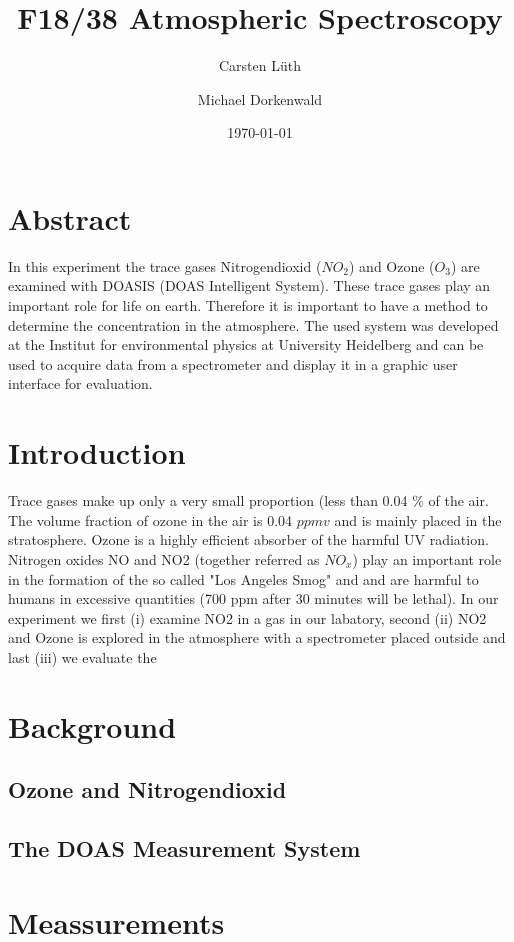 \documentclass[12pt, english]{scrartcl} %
\title{F18/38 Atmospheric Spectroscopy}
\author{Carsten L{\"u}th \and Michael Dorkenwald}
\date{\today}
\begin{document}
\maketitle

\begin{multicols}{2}


\section{Abstract}
In this experiment the trace gases Nitrogendioxid ($NO_2$) and Ozone ($O_3$) are examined with DOASIS (DOAS Intelligent System). These trace gases play an important role for life on earth. Therefore it is important to have a method to determine the concentration in the atmosphere. The used system was developed at the Institut for environmental physics at University Heidelberg and can be used to acquire data from a spectrometer and display it in a graphic user interface for evaluation.
\section{Introduction}
Trace gases make up only a very small proportion (less than 0.04 $\%$ of the air. The volume fraction of ozone in the air is 0.04 $ppmv$ and is mainly placed in the stratosphere. Ozone is a highly efficient absorber of the harmful UV radiation. Nitrogen oxides NO and NO2 (together referred as $NO_x$) play an important role in the formation of the so called "Los Angeles Smog" and and are harmful to humans in excessive quantities (700 ppm after 30 minutes will be lethal). In our experiment we first (i) examine NO2  in a gas in our labatory, second (ii) NO2 and Ozone is explored in the atmosphere with a spectrometer placed outside and last (iii) we evaluate the 
\section{Background}

\subsection{Ozone and Nitrogendioxid}

\subsection{The DOAS Measurement System}

\newpage
\section{Meassurements}

\end{multicols}
\end{document}
